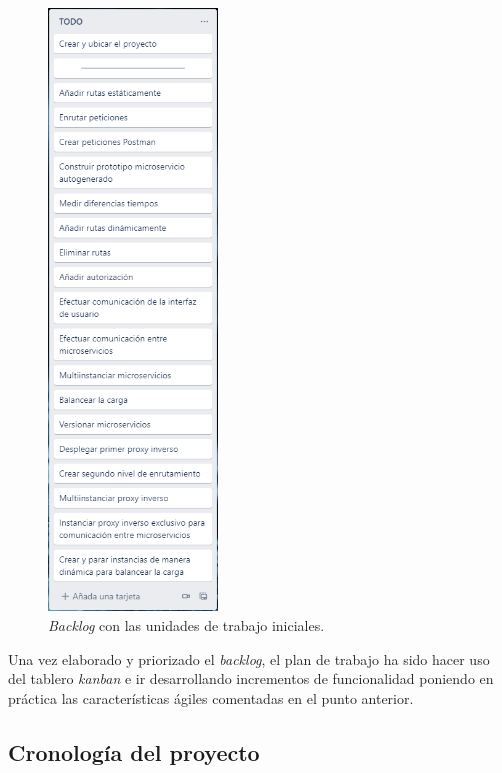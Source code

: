 \documentclass[11pt,spanish,listoffigures]{tfgetsinf}
\begin{document}
\begin{figure}[ht]
\centering
\includegraphics[width=0.40\textwidth]{imagenes/backlogInicial}
\caption{\emph{Backlog} con las unidades de trabajo iniciales.}
	\label{kanbanInicial}
\end{figure}

Una vez elaborado y priorizado el \emph{backlog}, el plan de trabajo ha sido hacer uso del tablero \emph{kanban} e ir desarrollando incrementos de funcionalidad poniendo en práctica las características ágiles comentadas en el punto anterior.


		\subsection{Cronología del proyecto}
\end{document}
